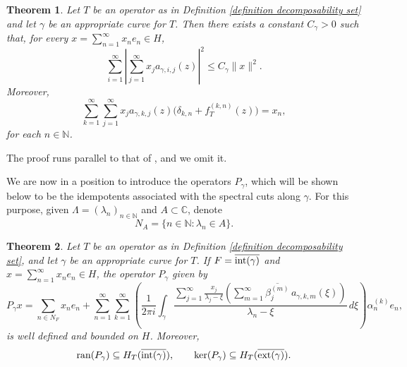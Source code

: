 \documentclass[11pt]{amsart}
\newtheorem{theorem}{Theorem}[section]
\theoremstyle{definition}
\theoremstyle{remark}
\numberwithin{equation}{section}
\newcommand{\ran}{\textnormal{ran}}
\newcommand{\Hext}{H_T(\overline{\exte(\gamma)})}
\newcommand{\sumn}{\sum_{n=1}^{\infty}}
\newcommand{\summ}{\sum_{m=1}^{\infty}}
\newcommand{\sumk}{\sum_{k=1}^{\infty}}
\newcommand{\sumi}{\sum_{i=1}^\infty}
\newcommand{\sumj}{\sum_{j=1}^\infty}
\newcommand{\inte}{\textnormal{int}}
\newcommand{\exte}{\textnormal{ext}}
\begin{document}
\begin{theorem}
Let $T$ be an operator as in Definition \ref{definition decomposability set} and let $\gamma$ be an appropriate curve for $T$. Then there exists a constant $C_\gamma > 0$ such that, for every $x=\sumn x_n e_n \in H$,
$$
\sumi \left| \sumj x_j a_{\gamma,i,j}(z) \right|^2 \le C_\gamma \|x\|^2 .
$$
Moreover,
$$
\sumk \sumj x_j a_{\gamma,k,j}(z)\bigl(\delta_{k,n}+f_T^{(k,n)}(z)\bigr) = x_n,
$$
for each $n\in \mathbb{N}$.	
\end{theorem}


The proof runs parallel to that of \cite[Theorem 3.6]{GG3}, and we omit it.

\medskip

We are now in a position to introduce the operators $P_\gamma$, which will be shown below to be the idempotents associated with the spectral cuts along $\gamma$. For this purpose, given $\Lambda=(\lambda_n)_{n\in\mathbb{N}}$ and $A\subset\mathbb{C}$, denote
$$
N_A=\{n\in\mathbb{N}:\lambda_n\in A\}.
$$
	

\begin{theorem}\label{teorema definición f(T)}
Let $T$ be an operator as in Definition \ref{definition decomposability set}, and let $\gamma$ be an appropriate curve for $T$. If  $F=\overline{\inte(\gamma)}$ and $x=\sumn x_n e_n \in H$, the operator $P_\gamma$ given by
\begin{equation}
P_\gamma x = \sum_{n\in N_F} x_n e_n
+\sumn \sum_{k=1}^{\infty}
\left(
\frac{1}{2\pi i}\int_{\gamma}
\frac{\displaystyle \sumj \frac{x_j}{\lambda_j-\xi}
\left(\summ \overline{\beta_j^{(m)}}\, a_{\gamma,k,m}(\xi)\right)}
{\lambda_n-\xi}\, d\xi
\right)
\alpha_n^{(k)} e_n,\label{operador P}
\end{equation}
is well defined and bounded on $H$.	Moreover,
$$\ran(P_\gamma)\subseteq H_T(\overline{\inte(\gamma)}), \qquad \ker(P_\gamma)\subseteq \Hext.$$
\end{theorem}
\end{document}
